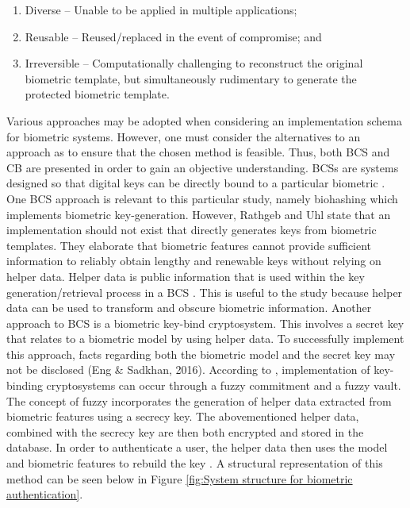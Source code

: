 \begin{enumerate}[label=\roman*.]
	\item Diverse – Unable to be applied in multiple applications;
	\item Reusable – Reused/replaced in the event of compromise; and
	\item Irreversible – Computationally challenging to reconstruct the original biometric template, but simultaneously rudimentary to generate the protected biometric template.
\end{enumerate}

Various approaches may be adopted when considering an implementation schema for biometric systems. However, one must consider the alternatives to an approach as to ensure that the chosen method is feasible. Thus, both BCS and CB are presented in order to gain an objective understanding. 
BCSs are systems designed so that digital keys can be directly bound to a particular biometric \cite{Rathgeb2011}. One BCS approach is relevant to this particular study, namely biohashing which implements biometric key-generation. However, Rathgeb and Uhl \cite{Rathgeb2011} state that an implementation should not exist that directly generates keys from biometric templates. They elaborate that biometric features cannot provide sufficient information to reliably obtain lengthy and renewable keys without relying on helper data. Helper data is public information that is used within the key generation/retrieval process in a BCS \cite{Rathgeb2011}.  This is useful to the study because helper data can be used to transform and obscure biometric information. Another approach to BCS is a biometric key-bind cryptosystem. This involves a secret key that relates to a biometric model by using helper data. To successfully implement this approach, facts regarding both the biometric model and the secret key may not be disclosed (Eng \& Sadkhan, 2016). According to \cite{Paul2014,Rathgeb2011}, implementation of key-binding cryptosystems can occur through a fuzzy commitment and a fuzzy vault. The concept of fuzzy incorporates the generation of helper data extracted from biometric features using a secrecy key. The abovementioned helper data, combined with the secrecy key are then both encrypted and stored in the database. In order to authenticate a user, the helper data then uses the model and biometric features to rebuild the key \cite{Eng2016}. A structural representation of this method can be seen below in Figure \ref{fig:System structure for biometric authentication}.

